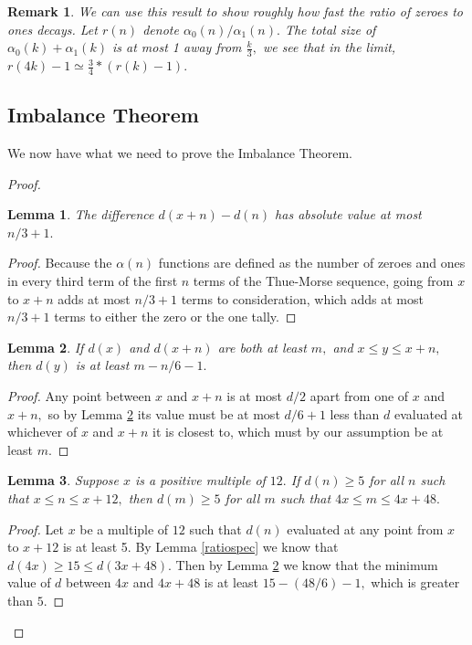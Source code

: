 \documentclass{article}
\newtheorem{lemma}{Lemma}[section]
\newtheorem{remark}{Remark}[section]
\begin{document}
\begin{remark}
We can use this result to show roughly how fast the ratio of zeroes to ones decays. Let $r(n)$ denote $\alpha_0(n)/\alpha_1(n).$ The total size of $\alpha_0(k) + \alpha_1(k)$ is at most 1 away from $\frac{k}{3},$ we see that in the limit, $r(4k) - 1 \simeq \frac{3}{4} * (r(k) - 1).$
\end{remark}

\subsection{Imbalance Theorem}

We now have what we need to prove the Imbalance Theorem.

\begin{proof}

\begin{lemma}
\label{diff}
The difference $d(x+n) - d(n)$ has absolute value at most $n/3 + 1.$
\end{lemma}

\begin{proof}
Because the $\alpha(n)$ functions are defined as the number of zeroes and ones in every third term of the first $n$ terms of the Thue-Morse sequence, going from $x$ to $x+n$ adds at most $n/3 + 1$ terms to consideration, which adds at most $n/3 + 1$ terms to either the zero or the one tally.
\end{proof}

\begin{lemma}
\label{dip}
If $d(x)$ and $d(x+n)$ are both at least $m,$ and $x \leq y \leq x+n,$ then $d(y)$ is at least $m - n/6 - 1.$
\end{lemma}

\begin{proof}
Any point between $x$ and $x+n$ is at most $d/2$ apart from one of $x$ and $x+n,$ so by Lemma \ref{dip} its value must be at most $d/6 + 1$ less than $d$ evaluated at whichever of $x$ and $x+n$ it is closest to, which must by our assumption be at least $m.$
\end{proof}

\begin{lemma}
\label{x12}
Suppose $x$ is a positive multiple of $12.$ If $d(n) \geq 5$ for all $n$ such that $x \leq n \leq x+12,$ then $d(m) \geq 5$ for all $m$ such that $4x \leq m \leq 4x+48.$
\end{lemma}

\begin{proof}
Let $x$ be a multiple of $12$ such that $d(n)$ evaluated at any point from $x$ to $x+12$ is at least 5. By Lemma \ref{ratiospec} we know that $d(4x) \geq 15 \leq d(3x+48).$ Then by Lemma \ref{dip} we know that the minimum value of $d$ between $4x$ and $4x+48$ is at least $15 - (48/6) - 1,$ which is greater than $5.$
\end{proof}


\end{proof}
\end{document}
